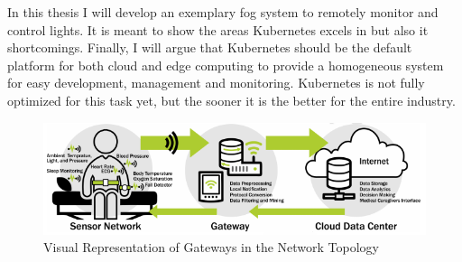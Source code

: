 In this thesis I will develop an exemplary fog system to remotely monitor and control lights. It is meant to show the areas Kubernetes excels in but also it shortcomings. Finally, I will argue that Kubernetes should be the default platform for both cloud and edge computing to provide a homogeneous system for easy development, management and monitoring. Kubernetes is not fully optimized for this task yet, but the sooner it is the better for the entire industry.

\begin{figure}[ht]
    \centering
    \includegraphics[width=\textwidth]{figures/iotSetup.png}
    \caption{Visual Representation of Gateways in the Network Topology\cite{BoschIoT13:online}}
    \label{fig:boschIoTGatewaySetup}
\end{figure}



% 


% 

% 
